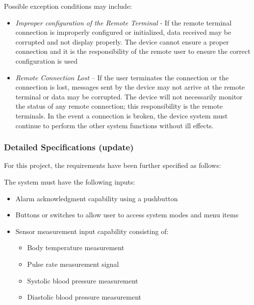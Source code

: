 \documentclass[12pt]{article} %
\begin{document}
Possible exception conditions may include:
\begin{itemize}
  \item \emph{Improper configuration of the Remote Terminal} - If the remote
    terminal connection is improperly configured or initialized, data received
    may be corrupted and not display properly. The device cannot ensure a
    proper connection and it is the responsibility of the remote user to ensure
    the correct configuration is used
  \item \emph{Remote Connection Lost} – If the user terminates the connection
    or the connection is lost, messages sent by the device may not arrive at
    the remote terminal or data may be corrupted. The device will not
    necessarily monitor the status of any remote connection; this
    responsibility is the remote terminals. In the event a connection is
    broken, the device system must continue to perform the other system
    functions without ill effects.
\end{itemize}


\subsubsection{Detailed Specifications (update)}
For this project, the requirements have been further specified as follows:

\begin{itemize}[$$]
  \item The system must have the following inputs:
    \begin{itemize}[$\bullet$]
      \item Alarm acknowledgment capability using a pushbutton
      \item Buttons or switches to allow user to access system modes and menu items
      \item Sensor measurement input capability consisting of:
	\begin{itemize}
	  \item Body temperature measurement
	  \item Pulse rate measurement signal
	  \item Systolic blood pressure measurement
	  \item Diastolic blood pressure measurement
	\end{itemize}
    \end{itemize}
\end{itemize}
\end{document}
